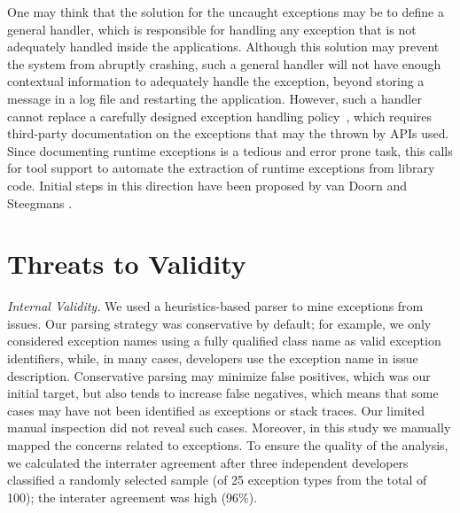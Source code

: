 \documentclass[conference]{IEEEtran}
\begin{document}
One may think that the solution for the uncaught exceptions may be to define a general handler, 
which is responsible for handling any exception that is not
adequately handled inside the applications. Although this 
solution may prevent  the system from abruptly crashing,
 such a general handler will not have enough
contextual information to adequately handle the exception, 
beyond storing a message in a log file and restarting the application.
However, such a handler cannot replace a carefully designed exception 
handling policy~\cite{Robil00}, which requires
third-party documentation on the exceptions that
may the thrown by APIs used. 
Since  documenting runtime exceptions is a tedious and error prone
task, 
this calls for tool support to automate the extraction of runtime exceptions
from library code. Initial steps in this direction have been proposed
by van Doorn and Steegmans \cite{van2005combining}.



\section{Threats to Validity}
\label{sec:threats}

\emph{Internal Validity.} We used a heuristics-based parser to mine
exceptions from issues.  Our parsing strategy was conservative by default; for
example, we only considered exception names using a fully qualified class name
as valid exception identifiers, while, in many cases, developers use the
exception name in issue description. Conservative parsing may minimize false
positives, which was our initial target, but also tends to increase false
negatives, which means that some cases may have not been identified as
exceptions or stack traces. Our limited manual inspection did not reveal such
cases. Moreover, in this study we manually mapped the concerns related
to exceptions. To ensure the quality of the analysis, we calculated the
 interrater agreement after three independent 
developers classified a randomly selected sample (of 25 exception 
types from the total of 100); the interater agreement was high (96\%). 
\end{document}
